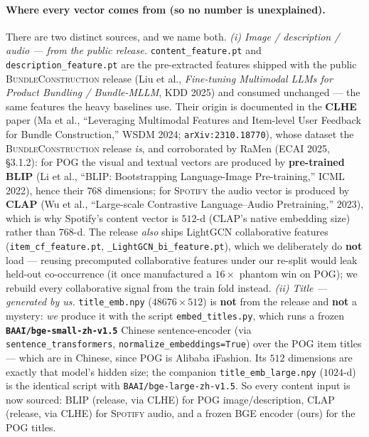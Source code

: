 \documentclass[11pt]{article}
\theoremstyle{remark}
\newcommand{\code}[1]{\texttt{\small #1}}
\begin{document}
\paragraph{Where every vector comes from (so no number is unexplained).} There are two distinct sources, and we name
both.
\emph{(i) Image / description / audio --- from the public release.} \code{content\_feature.pt} and
\code{description\_feature.pt} are the pre-extracted features shipped with the public \textsc{BundleConstruction}
release (Liu et al., \emph{Fine-tuning Multimodal LLMs for Product Bundling / Bundle-MLLM}, KDD 2025) and consumed
unchanged --- the same features the heavy baselines use. Their origin is documented in the \textbf{CLHE} paper
(Ma et al., ``Leveraging Multimodal Features and Item-level User Feedback for Bundle Construction,'' WSDM 2024;
\code{arXiv:2310.18770}), whose dataset the \textsc{BundleConstruction} release \emph{is}, and corroborated by RaMen
(ECAI 2025, \S3.1.2): for \textsc{POG} the visual and textual vectors are produced by \textbf{pre-trained BLIP}
(Li et al., ``BLIP: Bootstrapping Language-Image Pre-training,'' ICML 2022), hence their $768$ dimensions; for
\textsc{Spotify} the audio vector is produced by \textbf{CLAP} (Wu et al., ``Large-scale Contrastive
Language--Audio Pretraining,'' 2023), which is why Spotify's content vector is $512$-d (CLAP's native embedding size)
rather than $768$-d. The release \emph{also} ships LightGCN collaborative features (\code{item\_cf\_feature.pt},
\code{*\_LightGCN\_bi\_feature.pt}), which we deliberately do \textbf{not} load --- reusing precomputed collaborative
features under our re-split would leak held-out co-occurrence (it once manufactured a $16\times$ phantom win on
\textsc{POG}); we rebuild every collaborative signal from the train fold instead.
\emph{(ii) Title --- generated by us.} \code{title\_emb.npy} ($48676\times512$) is \textbf{not} from the release and
\textbf{not} a mystery: \emph{we} produce it with the script \code{embed\_titles.py}, which runs a frozen
\textbf{\code{BAAI/bge-small-zh-v1.5}} Chinese sentence-encoder (via \code{sentence\_transformers},
\code{normalize\_embeddings=True}) over the \textsc{POG} item titles --- which are in Chinese, since \textsc{POG} is
Alibaba iFashion. Its $512$ dimensions are exactly that model's hidden size; the companion \code{title\_emb\_large.npy}
($1024$-d) is the identical script with \code{BAAI/bge-large-zh-v1.5}. So every content input is now sourced: BLIP
(release, via CLHE) for \textsc{POG} image/description, CLAP (release, via CLHE) for \textsc{Spotify} audio, and a
frozen BGE encoder (ours) for the \textsc{POG} titles.
\end{document}
